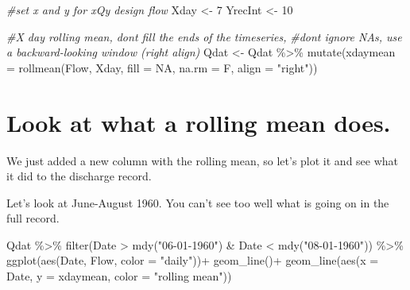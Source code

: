 \documentclass[
]{book}
\newenvironment{Shaded}{\begin{snugshade}}{\end{snugshade}}
\newcommand{\AttributeTok}[1]{\textcolor[rgb]{0.77,0.63,0.00}{#1}}
\newcommand{\CommentTok}[1]{\textcolor[rgb]{0.56,0.35,0.01}{\textit{#1}}}
\newcommand{\ConstantTok}[1]{\textcolor[rgb]{0.00,0.00,0.00}{#1}}
\newcommand{\DecValTok}[1]{\textcolor[rgb]{0.00,0.00,0.81}{#1}}
\newcommand{\FunctionTok}[1]{\textcolor[rgb]{0.00,0.00,0.00}{#1}}
\newcommand{\NormalTok}[1]{#1}
\newcommand{\OtherTok}[1]{\textcolor[rgb]{0.56,0.35,0.01}{#1}}
\newcommand{\SpecialCharTok}[1]{\textcolor[rgb]{0.00,0.00,0.00}{#1}}
\newcommand{\StringTok}[1]{\textcolor[rgb]{0.31,0.60,0.02}{#1}}
\begin{document}
\begin{Shaded}
\begin{Highlighting}[]
\CommentTok{\#set x and y for xQy design flow}
\NormalTok{Xday }\OtherTok{\textless{}{-}} \DecValTok{7}
\NormalTok{YrecInt }\OtherTok{\textless{}{-}} \DecValTok{10}

\CommentTok{\#X day rolling mean, don\textquotesingle{}t fill the ends of the timeseries,}
\CommentTok{\#don\textquotesingle{}t ignore NAs, use a backward{-}looking window (right align)}
\NormalTok{Qdat }\OtherTok{\textless{}{-}}\NormalTok{ Qdat }\SpecialCharTok{\%\textgreater{}\%} \FunctionTok{mutate}\NormalTok{(}\AttributeTok{xdaymean =} \FunctionTok{rollmean}\NormalTok{(Flow, }
\NormalTok{                                            Xday, }
                                            \AttributeTok{fill =} \ConstantTok{NA}\NormalTok{, }
                                            \AttributeTok{na.rm =}\NormalTok{ F, }
                                            \AttributeTok{align =} \StringTok{"right"}\NormalTok{))}
\end{Highlighting}
\end{Shaded}

\hypertarget{look-at-what-a-rolling-mean-does.}{%
\section{Look at what a rolling mean does.}\label{look-at-what-a-rolling-mean-does.}}

We just added a new column with the rolling mean, so let's plot it and see what it did to the discharge record.

Let's look at June-August 1960. You can't see too well what is going on in the full record.

\begin{Shaded}
\begin{Highlighting}[]
\NormalTok{Qdat }\SpecialCharTok{\%\textgreater{}\%} 
  \FunctionTok{filter}\NormalTok{(Date }\SpecialCharTok{\textgreater{}} \FunctionTok{mdy}\NormalTok{(}\StringTok{"06{-}01{-}1960"}\NormalTok{) }\SpecialCharTok{\&}\NormalTok{ Date }\SpecialCharTok{\textless{}} \FunctionTok{mdy}\NormalTok{(}\StringTok{"08{-}01{-}1960"}\NormalTok{)) }\SpecialCharTok{\%\textgreater{}\%}
  \FunctionTok{ggplot}\NormalTok{(}\FunctionTok{aes}\NormalTok{(Date, Flow, }\AttributeTok{color =} \StringTok{"daily"}\NormalTok{))}\SpecialCharTok{+}
    \FunctionTok{geom\_line}\NormalTok{()}\SpecialCharTok{+}
    \FunctionTok{geom\_line}\NormalTok{(}\FunctionTok{aes}\NormalTok{(}\AttributeTok{x =}\NormalTok{ Date, }\AttributeTok{y =}\NormalTok{ xdaymean, }\AttributeTok{color =} \StringTok{"rolling mean"}\NormalTok{))}
\end{Highlighting}
\end{Shaded}
\end{document}
